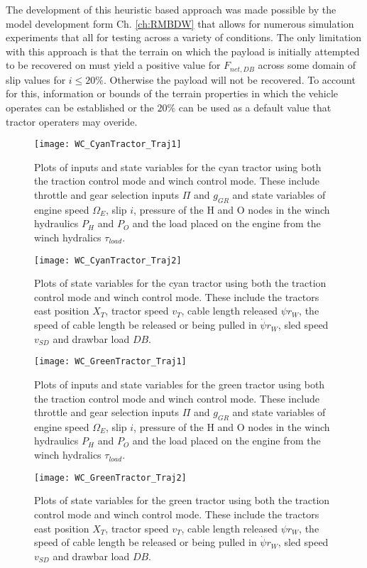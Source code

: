 The development of this heuristic based approach was made possible by the model development form Ch. \ref{ch:RMBDW} that allows for numerous simulation experiments that all for testing across a variety of conditions. The only limitation with this approach is that the terrain on which the payload is initially attempted to be recovered on must yield a positive value for $F_{net,DB}$ across some domain of slip values for $i \leq 20\%$. Otherwise the payload will not be recovered. To account for this, information or bounds of the terrain properties in which the vehicle operates can be established or the $20\%$ can be used as a default value that tractor operaters may overide.
\begin{figure}[p]
    \centering
    \texttt{[image: WC\_CyanTractor\_Traj1]}
    \caption{Plots of inputs and state variables for the cyan tractor using both the traction control mode and winch control mode. These include throttle and gear selection inputs $\Pi$ and $g_{GR}$ and state variables of engine speed $\Omega_E$, slip $i$, pressure of the H and O nodes in the winch hydraulics $P_H$ and $P_O$ and the load placed on the engine from the winch hydralics $\tau_{load}$.}
    \label{fig:WC_CyanTractor_Traj1}
\end{figure}
\begin{figure}[p]
    \centering
    \texttt{[image: WC\_CyanTractor\_Traj2]}
    \caption{Plots of state variables for the cyan tractor using both the traction control mode and winch control mode. These include the tractors east position $X_T$, tractor speed $v_T$, cable length released $\psi r_W$, the speed of cable length be released or being pulled in $\dot{\psi} r_W$, sled speed $v_{SD}$ and drawbar load $DB$.}
    \label{fig:WC_CyanTractor_Traj2}
\end{figure}
\begin{figure}[p]
    \centering
    \texttt{[image: WC\_GreenTractor\_Traj1]}
    \caption{Plots of inputs and state variables for the green tractor using both the traction control mode and winch control mode. These include throttle and gear selection inputs $\Pi$ and $g_{GR}$ and state variables of engine speed $\Omega_E$, slip $i$, pressure of the H and O nodes in the winch hydraulics $P_H$ and $P_O$ and the load placed on the engine from the winch hydralics $\tau_{load}$.}
    \label{fig:WC_GreenTractor_Traj1}
\end{figure}
\begin{figure}[p]
    \centering
    \texttt{[image: WC\_GreenTractor\_Traj2]}
    \caption{Plots of state variables for the green tractor using both the traction control mode and winch control mode. These include the tractors east position $X_T$, tractor speed $v_T$, cable length released $\psi r_W$, the speed of cable length be released or being pulled in $\dot{\psi} r_W$, sled speed $v_{SD}$ and drawbar load $DB$.}
    \label{fig:WC_GreenTractor_Traj2}
\end{figure}
